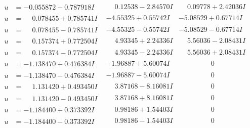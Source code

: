 \documentclass[1p]{elsarticle_modified}
\theoremstyle{definition}
\begin{document}
$$\begin{array}{c|c|c}
\begin{aligned}
u &= -0.055872 - 0.787918 I\end{aligned}
 & \phantom{-}0.12538 - 2.84570 I & \phantom{-}0.09778 + 2.42036 I \\ \hline\begin{aligned}
u &= \phantom{-}0.078455 + 0.785741 I\end{aligned}
 & -4.55325 + 0.55742 I & -5.08529 + 0.67714 I \\ \hline\begin{aligned}
u &= \phantom{-}0.078455 - 0.785741 I\end{aligned}
 & -4.55325 - 0.55742 I & -5.08529 - 0.67714 I \\ \hline\begin{aligned}
u &= \phantom{-}0.157374 + 0.772504 I\end{aligned}
 & \phantom{-}4.93345 + 2.24336 I & \phantom{-}5.56036 - 2.08431 I \\ \hline\begin{aligned}
u &= \phantom{-}0.157374 - 0.772504 I\end{aligned}
 & \phantom{-}4.93345 - 2.24336 I & \phantom{-}5.56036 + 2.08431 I \\ \hline\begin{aligned}
u &= -1.138470 + 0.476384 I\end{aligned}
 & -1.96887 + 5.60074 I & \phantom{-0.000000 } 0 \\ \hline\begin{aligned}
u &= -1.138470 - 0.476384 I\end{aligned}
 & -1.96887 - 5.60074 I & \phantom{-0.000000 } 0 \\ \hline\begin{aligned}
u &= \phantom{-}1.131420 + 0.493450 I\end{aligned}
 & \phantom{-}3.87168 - 8.16081 I & \phantom{-0.000000 } 0 \\ \hline\begin{aligned}
u &= \phantom{-}1.131420 - 0.493450 I\end{aligned}
 & \phantom{-}3.87168 + 8.16081 I & \phantom{-0.000000 } 0 \\ \hline\begin{aligned}
u &= -1.184400 + 0.373392 I\end{aligned}
 & \phantom{-}0.98186 + 1.54403 I & \phantom{-0.000000 } 0 \\ \hline\begin{aligned}
u &= -1.184400 - 0.373392 I\end{aligned}
 & \phantom{-}0.98186 - 1.54403 I & \phantom{-0.000000 } 0 \\ \hline\begin{aligned}

\end{aligned}
\end{array}$$
\end{document}
